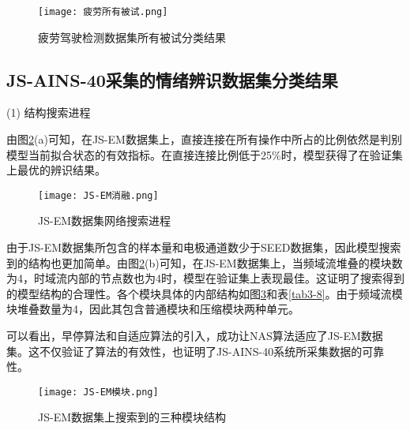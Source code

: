 \begin{figure}[!h]
	\centering
	\texttt{[image: 疲劳所有被试.png]}
	\caption{疲劳驾驶检测数据集所有被试分类结果} 
	\label{fig3-7}
\end{figure}


\subsection{JS-AINS-40采集的情绪辨识数据集分类结果}

(1) 结构搜索进程

由图\ref{fig3-8}(a)可知，在JS-EM数据集上，直接连接在所有操作中所占的比例依然是判别模型当前拟合状态的有效指标。在直接连接比例低于25\%时，模型获得了在验证集上最优的辨识结果。

\begin{figure}[!h]
	\centering
	\texttt{[image: JS-EM消融.png]}
	\caption{JS-EM数据集网络搜索进程} 
	\label{fig3-8}
\end{figure}

由于JS-EM数据集所包含的样本量和电极通道数少于SEED数据集，因此模型搜索到的结构也更加简单。由图\ref{fig3-8}(b)可知，在JS-EM数据集上，当频域流堆叠的模块数为4，时域流内部的节点数也为4时，模型在验证集上表现最佳。这证明了搜索得到的模型结构的合理性。各个模块具体的内部结构如图\ref{fig3-9}和表\ref{tab3-8}。由于频域流模块堆叠数量为4，因此其包含普通模块和压缩模块两种单元。

可以看出，早停算法和自适应算法的引入，成功让NAS算法适应了JS-EM数据集。这不仅验证了算法的有效性，也证明了JS-AINS-40系统所采集数据的可靠性。

\begin{figure}[!h]
	\centering
	\texttt{[image: JS-EM模块.png]}
	\caption{JS-EM数据集上搜索到的三种模块结构} 
	\label{fig3-9}
\end{figure}

